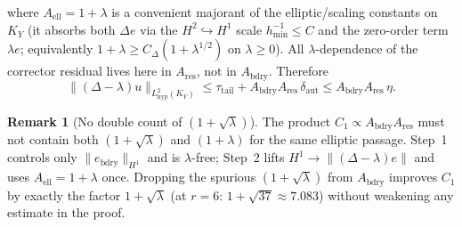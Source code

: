\documentclass[11pt]{amsart}
\theoremstyle{definition}
\newtheorem{remark}[theorem]{Remark}
\newcommand{\norm}[1]{\lVert#1\rVert}
\begin{document}
where $A_{\mathrm{ell}}=1+\lambda$ is a convenient majorant of the
elliptic/scaling constants on $K_Y$ (it absorbs both $\Delta e$ via the
$H^2\hookrightarrow H^1$ scale $h_{\min}^{-1}\le C$ and the zero-order
term $\lambda e$; equivalently $1+\lambda\ge C_{\Delta}(1+\lambda^{1/2})$
on $\lambda\ge 0$).  All $\lambda$-dependence of the corrector residual
lives here in $A_{\mathrm{res}}$, not in $A_{\mathrm{bdry}}$.  Therefore
\begin{equation}
\label{eq:step2}
  \norm{(\Delta-\lambda)u}_{L^2_{\mathrm{hyp}}(K_Y)}
  \le
  \tau_{\mathrm{tail}}
  +
  A_{\mathrm{bdry}}A_{\mathrm{res}}\,\delta_{\mathrm{aut}}
  \le
  A_{\mathrm{bdry}}A_{\mathrm{res}}\,\eta.
  \tag{2}
\end{equation}

\begin{remark}[No double count of $(1+\sqrt{\lambda})$]
\label{rem:no-double-sqrt}
The product $C_1\propto A_{\mathrm{bdry}}A_{\mathrm{res}}$ must not contain
both $(1+\sqrt{\lambda})$ and $(1+\lambda)$ for the same elliptic passage.
Step~1 controls only $\norm{e_{\mathrm{bdry}}}_{H^1}$ and is $\lambda$-free;
Step~2 lifts $H^1\to\norm{(\Delta-\lambda)e}$ and uses $A_{\mathrm{ell}}=1+\lambda$
once.  Dropping the spurious $(1+\sqrt{\lambda})$ from $A_{\mathrm{bdry}}$
improves $C_1$ by exactly the factor $1+\sqrt{\lambda}$ (at $r=6$:
$1+\sqrt{37}\approx 7.083$) without weakening any estimate in the proof.
\end{remark}
\end{document}

